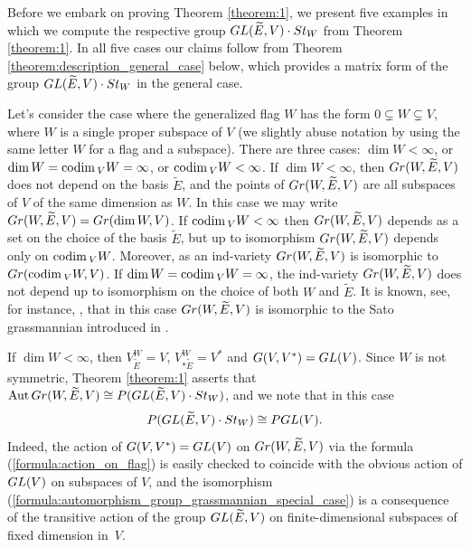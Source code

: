 \documentclass[11pt, a4paper]{article}
\begin{document}

Before we embark on proving Theorem \ref{theorem:1}, we present five examples in which we compute the respective group $GL(\widetilde{E},V) \cdot St_W$ from Theorem \ref{theorem:1}. %
In all five cases our claims follow from Theorem \ref{theorem:description_general_case} below, which provides a matrix form of the group $GL(\widetilde{E},V) \cdot St_W$ in the general case.

 Let's consider the case where the generalized flag $W$ has the form $0\subsetneq W\subsetneq V$, where $W$ is a single proper subspace of $V$ (we slightly abuse notation by using the same letter $W$ for a flag and a subspace). There are three cases: $\dim W<\infty$, or $\dim W=\mathrm{codim}\,_V W=\infty$, or $\mathrm{codim}\,_V W<\infty$. If $\dim W<\infty$, then $Gr(W,\widetilde{E},V)$ does not depend on the basis $\widetilde{E}$, and the points of $Gr(W,\widetilde{E},V)$ are all subspaces of $V$ of the same dimension as $W$. In this case we may write $Gr(W,\widetilde{E},V)=Gr(\dim W, V)$. If $\mathrm{codim}\,_V W<\infty$ then $Gr(W,\widetilde{E},V)$ depends as a set on the choice of the basis $\widetilde{E}$, but up to isomorphism $Gr(W,\widetilde{E},V)$ depends only on $\mathrm{codim}\,_V W$. Moreover, as an ind-variety $Gr(W,\widetilde{E},V)$ is isomorphic to $Gr(\mathrm{codim}\,_V W,V)$. If $\dim W=\mathrm{codim}\,_V W=\infty$, the ind-variety $Gr(W,\widetilde{E}, V)$ does not depend up to isomorphism on the choice of both $W$ and $\widetilde{E}$. It is known, see, for instance, \cite{GattoSalehyan}, that in this case $Gr(W,\widetilde{E}, V)$ is isomorphic to the Sato grassmannian introduced in \cite{Sato}.

If $\dim W<\infty$, then $V^W_{\widetilde{E}}=V$, $V^W_{*\widetilde{E}}=V^*$ and $ G(V,V^*)=GL(V)$. Since $W$ is not symmetric, Theorem \ref{theorem:1} asserts that $\mathrm{Aut}\,Gr(W,\widetilde{E},V)\cong P(GL(\widetilde{E},V) \cdot St_W)$, and we note that in this case  \begin{equation}\label{formula:automorphism_group_grassmannian_special_case}
    P(GL(\widetilde{E},V) \cdot St_W)\cong P GL(V).
\end{equation}
Indeed, the action of $ G(V,V^*)=GL(V)$ on $Gr(W,\widetilde{E},V)$ via the formula (\ref{formula:action_on_flag}) is easily checked to coincide with the obvious action of $GL(V)$ on subspaces of $V$, and the isomorphism (\ref{formula:automorphism_group_grassmannian_special_case}) is a consequence of the transitive action of the group $GL(\widetilde{E},V)$ on finite-dimensional subspaces of fixed dimension in~$V$.
\end{document}
